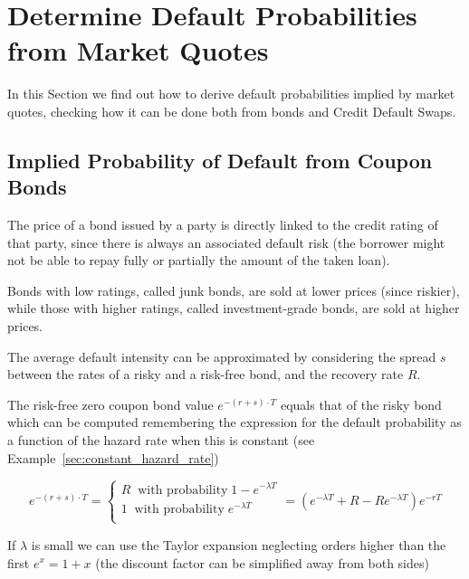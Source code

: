 \section{Determine Default Probabilities from Market Quotes}
In this Section we find out how to derive default probabilities implied by market quotes, checking how it can be done both from bonds and Credit Default Swaps.

\subsection{Implied Probability of Default from Coupon Bonds}
\label{default-probabilities-and-bond-prices}

The price of a bond issued by a party is directly linked to the credit rating of that party, since there is always an associated default risk (the borrower might not be able to repay fully or partially the amount of the taken loan). 

Bonds with low ratings, called junk bonds, are sold at lower prices (since riskier), while those with higher ratings, called investment-grade bonds, are sold at higher prices.


The average default intensity can be approximated by considering the spread $s$ between the rates of a risky and a risk-free bond, and the recovery rate $R$.

The risk-free zero coupon bond value $e^{-(r+s)\cdot T}$ equals that of the risky bond which can be computed remembering the expression for the default probability as a function of the hazard rate when this is constant (see Example~\ref{sec:constant_hazard_rate})

\begin{equation}
e^{-(r+s)\cdot T} = 
\begin{cases}
R\;\;\textrm{with probability}\;1 - e^{-\lambda T} \\
1\;\;\textrm{with probability}\;e^{-\lambda T} \\
\end{cases} = 
(e^{-\lambda T} + R - R e^{-\lambda T})e^{-rT}
\end{equation}

If $\lambda$ is small we can use the Taylor expansion neglecting orders higher than the first $e^{x} = 1 + x$ (the discount factor can be simplified away from both sides)

